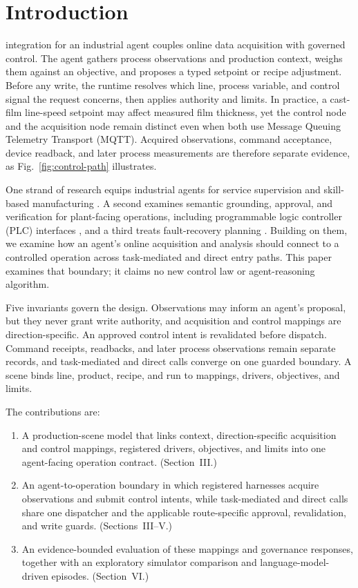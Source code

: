 \section{Introduction}
 integration for an industrial agent couples online data acquisition with governed control. The agent gathers process observations and production context, weighs them against an objective, and proposes a typed setpoint or recipe adjustment. Before any write, the runtime resolves which line, process variable, and control signal the request concerns, then applies authority and limits. In practice, a cast-film line-speed setpoint may affect measured film thickness, yet the control node and the acquisition node remain distinct even when both use Message Queuing Telemetry Transport (MQTT). Acquired observations, command acceptance, device readback, and later process measurements are therefore separate evidence, as Fig.~\ref{fig:control-path} illustrates.

One strand of research equips industrial agents for service supervision and skill-based manufacturing \cite{biskupovic2025supervision,koehle2026llmdriven}. A second examines semantic grounding, approval, and verification for plant-facing operations, including programmable logic controller (PLC) interfaces \cite{graul2026aas,schall2026safe}, and a third treats fault-recovery planning \cite{vyas2026detection}. Building on them, we examine how an agent's online acquisition and analysis should connect to a controlled operation across task-mediated and direct entry paths. This paper examines that boundary; it claims no new control law or agent-reasoning algorithm.

Five invariants govern the design. Observations may inform an agent's proposal, but they never grant write authority, and acquisition and control mappings are direction-specific. An approved control intent is revalidated before dispatch. Command receipts, readbacks, and later process observations remain separate records, and task-mediated and direct calls converge on one guarded boundary. A scene binds line, product, recipe, and run to mappings, drivers, objectives, and limits.

The contributions are:
\begin{enumerate}
  \item A production-scene model that links context, direction-specific acquisition and control mappings, registered drivers, objectives, and limits into one agent-facing operation contract. (Section~III.)
  \item An agent-to-operation boundary in which registered harnesses acquire observations and submit control intents, while task-mediated and direct calls share one dispatcher and the applicable route-specific approval, revalidation, and write guards. (Sections~III--V.)
  \item An evidence-bounded evaluation of these mappings and governance responses, together with an exploratory simulator comparison and language-model-driven episodes. (Section~VI.)
\end{enumerate}

